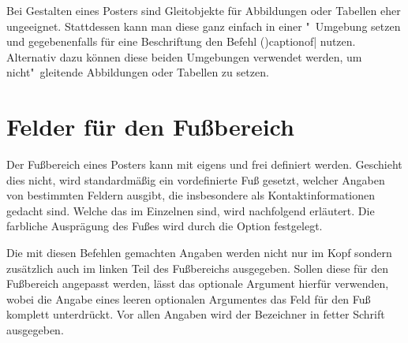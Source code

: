 \begin{DeclareEntity}{}
\begin{Declaration}
\begin{Declaration}
Bei Gestalten eines Posters sind Gleitobjekte für Abbildungen oder Tabellen 
eher ungeeignet. Stattdessen kann man diese ganz einfach in einer 
"~Umgebung setzen und gegebenenfalls für eine 
Beschriftung den Befehl
\Macro(){captionof|} 
nutzen. Alternativ dazu können diese beiden Umgebungen verwendet werden, um 
nicht"~gleitende Abbildungen oder Tabellen zu setzen.
\end{Declaration}
\end{Declaration}



\section{%
  Felder für den Fußbereich%
  \label{sec:poster:foot}%
}

Der Fußbereich eines Posters kann mit  eigens und frei 
definiert werden. Geschieht dies nicht, wird standardmäßig ein vordefinierte 
Fuß gesetzt, welcher Angaben von bestimmten Feldern ausgibt, die insbesondere 
als Kontaktinformationen gedacht sind. Welche das im Einzelnen sind, wird 
nachfolgend erläutert. Die farbliche Ausprägung des Fußes wird durch die Option
 festgelegt.

\begin{Declaration}
  {}
\begin{Declaration}
  {}
\begin{Declaration}
  {}
\begin{Declaration}
  {}
\printdeclarationlist

Die mit diesen Befehlen gemachten Angaben werden nicht nur im Kopf sondern 
zusätzlich auch im linken Teil des Fußbereichs ausgegeben. Sollen diese für den 
Fußbereich angepasst werden, lässt das optionale Argument hierfür verwenden, 
wobei die Angabe eines leeren optionalen Argumentes das Feld für den Fuß 
komplett unterdrückt. Vor allen Angaben wird der Bezeichner  
in fetter Schrift ausgegeben.
\end{Declaration}
\end{Declaration}
\end{Declaration}
\end{Declaration}



\end{DeclareEntity}

